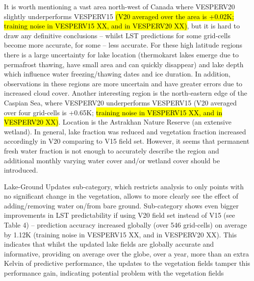 \documentclass[hess, twostagejnl]{copernicus}
\begin{document}
\noindent It is worth mentioning a vast area north-west of Canada where VESPERV20 slightly underperforms VESPERV15 \hl{(V20 averaged over the area is +0.02K; training noise in VESPERV15 XX, and in VESPERV20 XX)}, but it is hard to draw any definitive conclusions – whilst LST predictions for some grid-cells become more accurate, for some – less accurate. For these high latitude regions there is a large uncertainty for lake location (thermokarst lakes emerge due to permafrost thawing, have small area and can quickly disappear) and lake depth which influence water freezing/thawing dates and ice duration. In addition, observations in these regions are more uncertain and have greater errors due to increased cloud cover. Another interesting region is the north-eastern edge of the Caspian Sea, where VESPERV20 underperforms VESPERV15 (V20 averaged over four grid-cells is +0.65K; \hl{training noise in VESPERV15 XX, and in VESPERV20 XX)}. Location is the Astrakhan Nature Reserve (an extensive wetland). In general, lake fraction was reduced and vegetation fraction increased accordingly in V20 comparing to V15 field set. However, it seems that permanent fresh water fraction is not enough to accurately describe the region and additional monthly varying water cover and/or wetland cover should be introduced. \newline 


\noindent Lake-Ground Updates sub-category, which restricts analysis to only points with no significant change in the vegetation, allows to more clearly see the effect of adding/removing water on/from bare ground. Sub-category shows even bigger improvements in LST predictability if using V20 field set instead of V15 (see Table 4) – prediction accuracy increased globally (over 546 grid-cells) on average by 1.12K (training noise in VESPERV15 XX, and in VESPERV20 XX). This indicates that whilst the updated lake fields are globally accurate and informative, providing on average over the globe, over a year, more than an extra Kelvin of predictive performance, the updates to the vegetation fields tamper this performance gain, indicating potential problem with the vegetation fields
\end{document}
